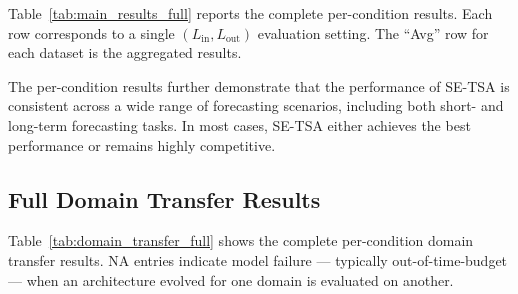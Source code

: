 Table~\ref{tab:main_results_full} reports the complete per-condition results. Each row corresponds to a single $(L_{\text{in}}, L_{\text{out}})$ evaluation setting. The ``Avg'' row for each dataset is the aggregated results.

The per-condition results further demonstrate that the performance of SE-TSA is consistent across a wide range of forecasting scenarios, including both short- and long-term forecasting tasks. In most cases, SE-TSA either achieves the best performance or remains highly competitive.

\subsection{Full Domain Transfer Results}
\label{app:domain_tranfer}

Table~\ref{tab:domain_transfer_full} shows the complete per-condition domain transfer results. NA entries indicate model failure --- typically out-of-time-budget --- when an architecture evolved for one domain is evaluated on another.

